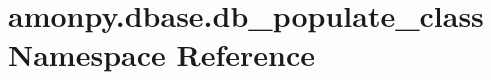 \hypertarget{namespaceamonpy_1_1dbase_1_1db__populate__class}{\section{amonpy.\-dbase.\-db\-\_\-populate\-\_\-class Namespace Reference}
\label{namespaceamonpy_1_1dbase_1_1db__populate__class}
}
